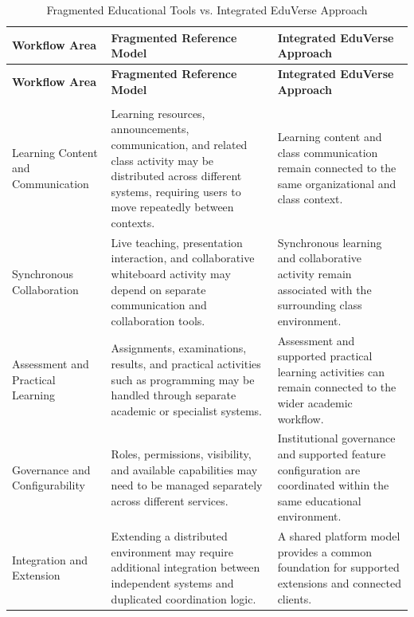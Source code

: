 \begingroup
\footnotesize
\setlength{\tabcolsep}{4pt}
\renewcommand{\arraystretch}{1.15}
\begin{longtable}{|>{\raggedright\arraybackslash}p{}|>{\raggedright\arraybackslash}p{}|>{\raggedright\arraybackslash}p{}|}
\caption{Fragmented Educational Tools vs. Integrated EduVerse Approach}
\label{tab:fragmented_vs_integrated_eduverse} \\
\hline
\rowcolor{gray!15}
\textbf{Workflow Area} &
\textbf{Fragmented Reference Model} &
\textbf{Integrated EduVerse Approach} \\
\hline
\endfirsthead
\hline
\rowcolor{gray!15}
\textbf{Workflow Area} &
\textbf{Fragmented Reference Model} &
\textbf{Integrated EduVerse Approach} \\
\hline
\endhead
\hline
\multicolumn{3}{r}{\small\textit{Continued on the next page}} \\
\endfoot
\hline
\endlastfoot
Learning Content and Communication &
Learning resources, announcements, communication, and related class activity
may be distributed across different systems, requiring users to move repeatedly
between contexts. &
Learning content and class communication remain connected to the same
organizational and class context. \\
\hline
Synchronous Collaboration &
Live teaching, presentation interaction, and collaborative whiteboard activity
may depend on separate communication and collaboration tools. &
Synchronous learning and collaborative activity remain associated with the
surrounding class environment. \\
\hline
Assessment and Practical Learning &
Assignments, examinations, results, and practical activities such as programming
may be handled through separate academic or specialist systems. &
Assessment and supported practical learning activities can remain connected to
the wider academic workflow. \\
\hline
Governance and Configurability &
Roles, permissions, visibility, and available capabilities may need to be
managed separately across different services. &
Institutional governance and supported feature configuration are coordinated
within the same educational environment. \\
\hline
Integration and Extension &
Extending a distributed environment may require additional integration between
independent systems and duplicated coordination logic. &
A shared platform model provides a common foundation for supported extensions
and connected clients. \\
\hline
\end{longtable}
\endgroup

